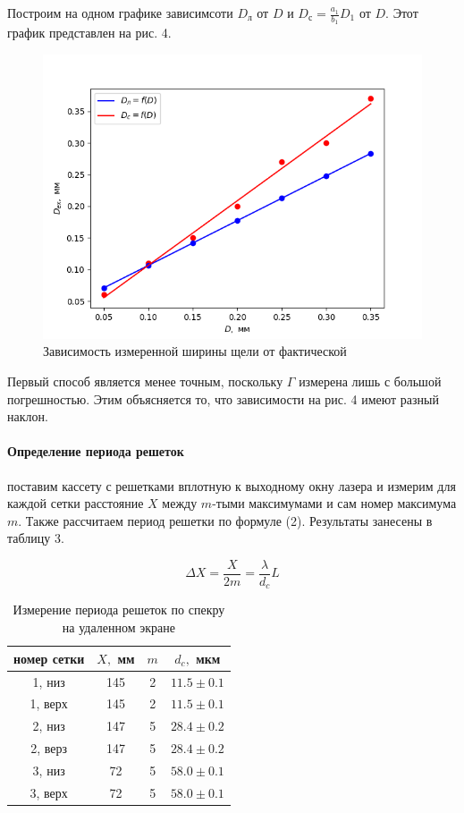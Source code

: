 \documentclass[a4paper,12pt]{article}
\begin{document}
\noindent
Построим на одном графике зависимсоти $D_\text{л}$ от $D$ и $D_\text{с} = \frac{a_1}{b_1}D_1$ от $D$. Этот график представлен на рис. 4.

\begin{figure}[H]
    \centering
    \includegraphics[scale=0.5]{II.png}
    \caption{Зависимость измеренной ширины щели от фактической}
\end{figure}

\noindent 
Первый способ является менее точным, поскольку $\Gamma$ измерена лишь с большой погрешностью. Этим объясняется то, что зависимости на рис. 4 имеют разный наклон.

\paragraph{Определение периода решеток} поставим кассету с решетками вплотную к выходному окну лазера и измерим для каждой сетки расстояние $X$ между $m$-тыми максимумами и сам номер максимума $m$. Также рассчитаем период решетки по формуле (2). Результаты занесены в таблицу 3.

\begin{equation}
    \Delta X = \frac{X}{2m} = \frac{\lambda}{d_c}L
\end{equation}

\begin{table}[H]
    \centering
    \caption{Измерение периода решеток по спекру на удаленном экране}
    \begin{tabular}{|c|c|c|c|} \hline
        номер сетки & $X,$ мм & $m$ & $d_c,$ мкм \\ \hline
        1, низ & 145 & 2 & $11.5 \pm 0.1$ \\ \hline
        1, верх & 145 & 2 & $11.5 \pm 0.1$ \\ \hline
        2, низ & 147 & 5 & $28.4 \pm 0.2$ \\ \hline
        2, верз & 147 & 5 & $28.4 \pm 0.2$ \\ \hline
        3, низ & 72 & 5 & $58.0 \pm 0.1$ \\ \hline
        3, верх & 72 & 5 & $58.0 \pm 0.1$ \\ \hline
    \end{tabular}
\end{table}
\end{document}
